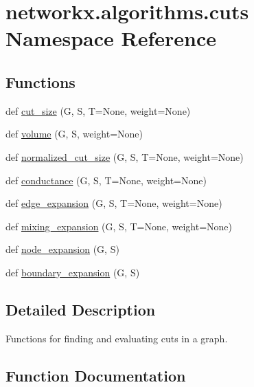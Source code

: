 \hypertarget{namespacenetworkx_1_1algorithms_1_1cuts}{}\section{networkx.\+algorithms.\+cuts Namespace Reference}
\label{namespacenetworkx_1_1algorithms_1_1cuts}
\subsection*{Functions}
\begin{DoxyCompactItemize}
\item 
def \hyperlink{namespacenetworkx_1_1algorithms_1_1cuts_a3eab74cd6337e44432d794a0761b6440}{cut\+\_\+size} (G, S, T=None, weight=None)
\item 
def \hyperlink{namespacenetworkx_1_1algorithms_1_1cuts_aba099ec7dcd9a10ba04202443c4453f9}{volume} (G, S, weight=None)
\item 
def \hyperlink{namespacenetworkx_1_1algorithms_1_1cuts_a7092b90008f99838b113597d801b9e9a}{normalized\+\_\+cut\+\_\+size} (G, S, T=None, weight=None)
\item 
def \hyperlink{namespacenetworkx_1_1algorithms_1_1cuts_a96f7d141bb0ecb21b2da6f642484b84a}{conductance} (G, S, T=None, weight=None)
\item 
def \hyperlink{namespacenetworkx_1_1algorithms_1_1cuts_ac90454cac45ff9549676b947df4aece8}{edge\+\_\+expansion} (G, S, T=None, weight=None)
\item 
def \hyperlink{namespacenetworkx_1_1algorithms_1_1cuts_ad6d523ba28c915b7f58652949d782d03}{mixing\+\_\+expansion} (G, S, T=None, weight=None)
\item 
def \hyperlink{namespacenetworkx_1_1algorithms_1_1cuts_a0baf73cd3e4ac469e4e401b321c33dcc}{node\+\_\+expansion} (G, S)
\item 
def \hyperlink{namespacenetworkx_1_1algorithms_1_1cuts_a6f634e722bca2e85bc85ffa9124688f1}{boundary\+\_\+expansion} (G, S)
\end{DoxyCompactItemize}


\subsection{Detailed Description}
\begin{DoxyVerb}Functions for finding and evaluating cuts in a graph.\end{DoxyVerb}
 

\subsection{Function Documentation}
\mbox{\label{namespacenetworkx_1_1algorithms_1_1cuts_a6f634e722bca2e85bc85ffa9124688f1}} 
